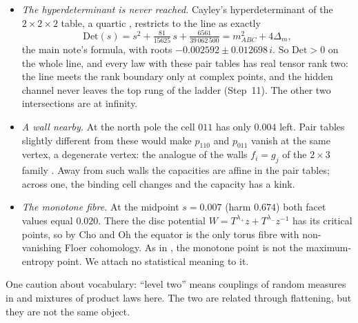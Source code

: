 \documentclass[11pt]{article}
\theoremstyle{definition}\newtheorem{definition}{Definition}\newtheorem{remark}{Remark}
\begin{document}
\begin{itemize}
  interaction is the toric quartic $p_{000}p_{011}p_{101}p_{110}=p_{001}p_{010}p_{100}p_{111}$ \cite{PachterSturmfels2005}. On the line the
  $s^4$ terms cancel, and the restriction is the cubic
  \[
  -s^3-\tfrac{27}{1250}s^2-\tfrac{37971}{5\,000\,000}\,s-\tfrac{143613}{6\,250\,000\,000}.
  \]
  It has one real root in the segment, $s=-0.003048$, and two complex roots $-0.00928\pm0.0863i$; the fourth point of intersection
  that Bézout's theorem requires is at infinity. By Birch's theorem the real root is the unique maximum-entropy law with these pair
  tables, the analogue of the gluing filler of \cite[Prop.~10.2]{Coupling}. Its triple harm, $0.6640$, lies inside the hiding segment
  and below the decision boundary $0.668$. A regulator who adopts it approves the triple, the right act here, and is immune to the
  hidden channel, which leaves the pair tables and hence the Birch point unchanged. But it gives up the probe: had the truth been on the
  other side of $0.668$, the Birch regulator would not know. At the truth the three-way odds ratio is $0.569$.
\item \emph{The hyperdeterminant is never reached.} Cayley's hyperdeterminant of the $2\times2\times2$ table, a quartic
  \cite{GelfandKapranovZelevinsky1994}, restricts to the line as exactly
  \[
  \mathrm{Det}(s)=s^2+\tfrac{81}{15625}\,s+\tfrac{6561}{39\,062\,500}=m_{ABC}^2+4\Delta_m ,
  \]
  the main note's formula, with roots $-0.002592\pm0.012698\,i$. So $\mathrm{Det}>0$ on the whole line, and every law with these pair
  tables has real tensor rank two: the line meets the rank boundary only at complex points, and the hidden channel never leaves the
  top rung of the ladder (Step~11). The other two intersections are at infinity.
\item \emph{A wall nearby.} At the north pole the cell $011$ has only $0.004$ left. Pair tables slightly different from these would make
  $p_{110}$ and $p_{011}$ vanish at the same vertex, a degenerate vertex: the analogue of the walls $f_i=g_j$ of the $2\times3$ family
  \cite[Thm.~3.1, Prop.~3.3]{Coupling}. Away from such walls the capacities are affine in the pair tables; across one, the binding cell
  changes and the capacity has a kink.
\item \emph{The monotone fibre.} At the midpoint $s=0.007$ (harm $0.674$) both facet values equal $0.020$. There the disc potential
  $W=T^{\lambda_+}z+T^{\lambda_-}z^{-1}$ has its critical points, so by Cho and Oh \cite{ChoOh2006} the equator is the only torus fibre with
  non-vanishing Floer cohomology. As in \cite[Example~6.2(a)]{Coupling}, the monotone point is not the maximum-entropy point. We attach no
  statistical meaning to it.
\end{itemize}
One caution about vocabulary: ``level two'' means couplings of random measures in \cite{Coupling} and mixtures of product laws here. The
two are related through flattening, but they are not the same object.
\end{document}
